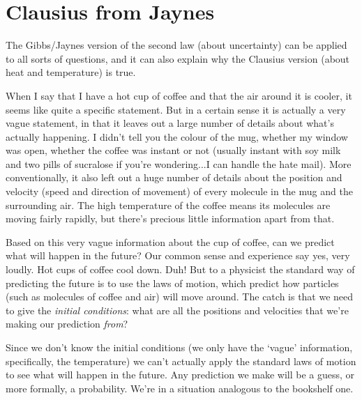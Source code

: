 \documentclass[a4paper, 12pt]{article}
\begin{document}

\section*{Clausius from Jaynes}
The Gibbs/Jaynes version of the second law (about uncertainty)
can be applied to all sorts of
questions, and it can also explain why the Clausius version (about heat and
temperature) is true. 

When I say that I have a hot cup of coffee and that the air around it is cooler,
it seems like quite a specific statement. But in a certain sense it is actually
a very vague statement, in that it leaves out a large number of details about
what's actually happening. I didn't tell you the colour of the mug, whether
my window was open, whether the coffee was instant or not (usually instant with
soy milk and two pills of sucralose if you're wondering...I can handle the hate mail). More conventionally, it also left out a huge number of details about the position and
velocity (speed and direction of movement) of every molecule in the mug and
the surrounding air. The high temperature of the coffee means its
molecules are moving fairly rapidly, but there's precious little information
apart from that.

Based on this very vague information about the cup of coffee, can we predict
what will happen in the future? Our common sense and experience say yes, very
loudly. Hot cups of coffee cool down. Duh!
But to a physicist the standard way of predicting the future is to use
the laws of motion, which predict how particles (such as molecules of coffee
and air) will move around. The catch is that we need to give the {\it initial
conditions}: what are all the positions and velocities that we're making our
prediction {\it from}?

Since we don't know the initial conditions (we only have the `vague' information, specifically, the temperature) we can't actually apply the standard laws of motion to
see what will happen in the future. Any prediction we make will be a
guess, or more formally, a probability. We're in a situation analogous to the
bookshelf one. 
\end{document}
